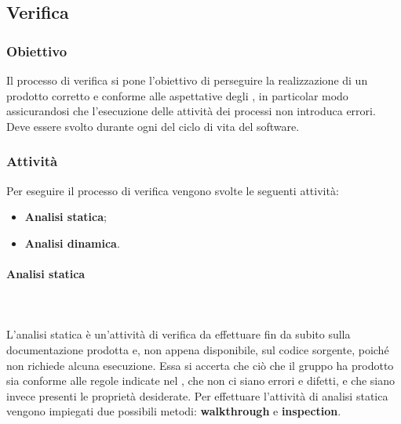 \subsection{Verifica}
\subsubsection{Obiettivo}
Il processo di verifica si pone l’obiettivo di perseguire la realizzazione di un prodotto corretto e conforme alle aspettative degli , in particolar modo assicurandosi che l'esecuzione delle attività dei processi non introduca errori.
Deve essere svolto durante ogni  del ciclo di vita del software.

\subsubsection{Attività}
Per eseguire il processo di verifica vengono svolte le seguenti attività:
\begin{itemize} 
    \item \textbf{Analisi statica};
    \item \textbf{Analisi dinamica}.
\end{itemize}

\paragraph{Analisi statica} \mbox{}\\ \\
L'analisi statica è un'attività di verifica da effettuare fin da subito sulla documentazione prodotta e, non appena disponibile, sul codice sorgente, poiché non richiede alcuna esecuzione.
Essa si accerta che ciò che il gruppo ha prodotto sia conforme alle regole indicate nel \PdQ{}, che non ci siano errori e difetti, e che siano invece presenti le proprietà desiderate.
Per effettuare l’attività di analisi statica vengono impiegati due possibili metodi: \textbf{walkthrough} e \textbf{inspection}.

